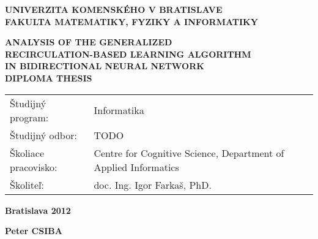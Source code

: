 \begin{center}
    \large{
        \textbf{
            UNIVERZITA KOMENSKÉHO V BRATISLAVE \\ 
            FAKULTA MATEMATIKY, FYZIKY A INFORMATIKY
        }
    }
\end{center}


\vspace{5cm}

\begin{center}
    \large{
        \textbf{
            ANALYSIS OF THE GENERALIZED \\
            RECIRCULATION-BASED LEARNING ALGORITHM \\
            IN BIDIRECTIONAL NEURAL NETWORK \\
            \vspace{3cm}
            DIPLOMA THESIS
        }
    }
\end{center}

\vfill

\begin{center}
    \begin{tabular}{ll}
        Študijný program:               &   Informatika \\
        Študijný odbor:                 &   TODO \\
        Školiace pracovisko:            &   Centre for Cognitive Science, Department of Applied Informatics \\
        Školiteľ:                       &   doc. Ing. Igor Farkaš, PhD. \\
    \end{tabular}
\end{center}

\vfill

\begin{multicols}{2}
    \begin{flushleft}
        \textbf{Bratislava 2012}
    \end{flushleft}
    \begin{flushright}
        \textbf{Peter CSIBA}
    \end{flushright}
\end{multicols}
